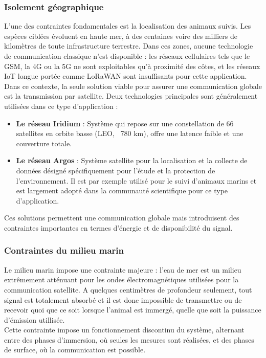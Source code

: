 \documentclass[12pt]{article}
\begin{document}
\subsubsection{Isolement géographique}
L’une des contraintes fondamentales est la localisation des animaux suivis. Les espèces ciblées évoluent en haute mer, à des centaines voire des milliers de kilomètres de toute infrastructure terrestre. Dans ces zones, aucune technologie de communication classique n’est disponible : les réseaux cellulaires tels que le GSM, la 4G ou la 5G ne sont exploitables qu’à proximité des côtes, et les réseaux IoT longue portée comme LoRaWAN sont insuffisants pour cette application. \\
Dans ce contexte, la seule solution viable pour assurer une communication globale est la transmission par satellite. Deux technologies principales sont généralement utilisées dans ce type d’application :
\begin{itemize}
	\item \textbf{Le réseau Iridium} : Système qui repose sur une constellation de 66 satellites en orbite basse (LEO, ~780 km), offre une latence faible et une couverture totale.
	\item \textbf{Le réseau Argos} : Système satellite pour la localisation et la collecte de données désigné spécifiquement pour l'étude et la protection de l'environnement. Il est par exemple utilisé pour le suivi d'animaux marins et est largement adopté dans la communauté scientifique pour ce type d'application.  
\end{itemize}
Ces solutions permettent une communication globale mais introduisent des contraintes importantes en termes d’énergie et de disponibilité du signal.


\subsubsection{Contraintes du milieu marin}
Le milieu marin impose une contrainte majeure : l'eau de mer est un milieu extrêmement atténuant pour les ondes électromagnétiques utilisées pour la communication satellite. A quelques centimètres de profondeur seulement, tout signal est totalement absorbé et il est donc impossible de transmettre ou de recevoir quoi que ce soit lorsque l'animal est immergé, quelle que soit la puissance d'émission utillisée.\\
Cette contrainte impose un fonctionnement discontinu du système, alternant entre des phases d’immersion, où seules les mesures sont réalisées, et des phases de surface, où la communication est possible.
\end{document}
